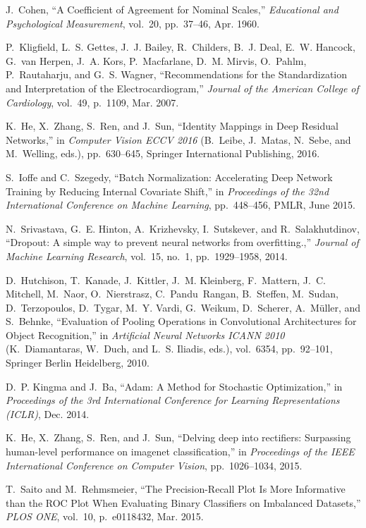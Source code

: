\documentclass{article}
\begin{document}
\begin{thebibliography}{10}
J.~Cohen, ``A {{Coefficient}} of {{Agreement}} for {{Nominal Scales}},'' {\em
  Educational and Psychological Measurement}, vol.~20, pp.~37--46, Apr. 1960.

P.~Kligfield, L.~S. Gettes, J.~J. Bailey, R.~Childers, B.~J. Deal, E.~W.
  Hancock, G.~{van Herpen}, J.~A. Kors, P.~Macfarlane, D.~M. Mirvis, O.~Pahlm,
  P.~Rautaharju, and G.~S. Wagner, ``Recommendations for the
  {{Standardization}} and {{Interpretation}} of the {{Electrocardiogram}},''
  {\em Journal of the American College of Cardiology}, vol.~49, p.~1109, Mar.
  2007.

K.~He, X.~Zhang, S.~Ren, and J.~Sun, ``Identity {{Mappings}} in {{Deep Residual
  Networks}},'' in {\em Computer {{Vision}} \textendash{} {{ECCV}} 2016}
  (B.~Leibe, J.~Matas, N.~Sebe, and M.~Welling, eds.), pp.~630--645, {Springer
  International Publishing}, 2016.

S.~Ioffe and C.~Szegedy, ``Batch {{Normalization}}: {{Accelerating Deep Network
  Training}} by {{Reducing Internal Covariate Shift}},'' in {\em Proceedings of
  the 32nd {{International Conference}} on {{Machine Learning}}}, pp.~448--456,
  {PMLR}, June 2015.

N.~Srivastava, G.~E. Hinton, A.~Krizhevsky, I.~Sutskever, and R.~Salakhutdinov,
  ``Dropout: A simple way to prevent neural networks from overfitting.,'' {\em
  Journal of Machine Learning Research}, vol.~15, no.~1, pp.~1929--1958, 2014.

D.~Hutchison, T.~Kanade, J.~Kittler, J.~M. Kleinberg, F.~Mattern, J.~C.
  Mitchell, M.~Naor, O.~Nierstrasz, C.~Pandu~Rangan, B.~Steffen, M.~Sudan,
  D.~Terzopoulos, D.~Tygar, M.~Y. Vardi, G.~Weikum, D.~Scherer, A.~M\"uller,
  and S.~Behnke, ``Evaluation of {{Pooling Operations}} in {{Convolutional
  Architectures}} for {{Object Recognition}},'' in {\em Artificial {{Neural
  Networks}} \textendash{} {{ICANN}} 2010} (K.~Diamantaras, W.~Duch, and L.~S.
  Iliadis, eds.), vol.~6354, pp.~92--101, {Springer Berlin Heidelberg}, 2010.

D.~P. Kingma and J.~Ba, ``Adam: {{A Method}} for {{Stochastic Optimization}},''
  in {\em Proceedings of the 3rd {{International Conference}} for {{Learning
  Representations}} ({{ICLR}})}, Dec. 2014.

K.~He, X.~Zhang, S.~Ren, and J.~Sun, ``Delving deep into rectifiers:
  {{Surpassing}} human-level performance on imagenet classification,'' in {\em
  Proceedings of the {{IEEE International Conference}} on {{Computer Vision}}},
  pp.~1026--1034, 2015.

T.~Saito and M.~Rehmsmeier, ``The {{Precision}}-{{Recall Plot Is More
  Informative}} than the {{ROC Plot When Evaluating Binary Classifiers}} on
  {{Imbalanced Datasets}},'' {\em PLOS ONE}, vol.~10, p.~e0118432, Mar. 2015.

\end{thebibliography}
\end{document}
